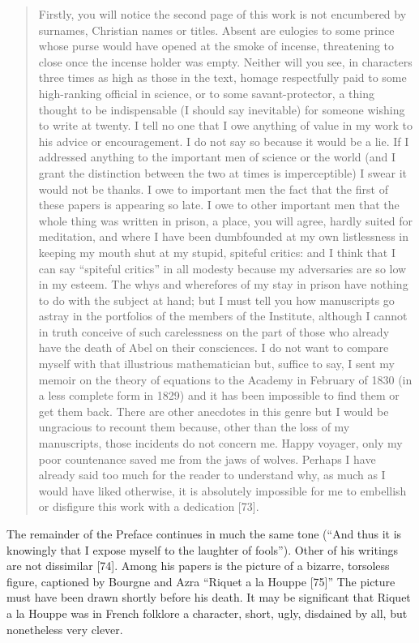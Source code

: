 \documentclass[12pt]{article}
\begin{document}
\begin{quote}
Firstly, you will notice the second page of this work is not encumbered by surnames, Christian names or titles. Absent are eulogies to some prince whose purse would have opened at the smoke of incense, threatening to close once the incense holder was empty. Neither will you see, in characters three times as high as those in the text, homage respectfully paid to some high-ranking official in science, or to some savant-protector, a thing thought to be indispensable (I should say inevitable) for someone wishing to write at twenty. I tell no one that I owe anything of value in my work to his advice or encouragement. I do not say so because it would be a lie. If I addressed anything to the important men of science or the world (and I grant the distinction between the two at times is imperceptible) I swear it would not be thanks. I owe to important men the fact that the first of these papers is appearing so late. I owe to other important men that the whole thing was written in prison, a place, you will agree, hardly suited for meditation, and where I have been dumbfounded at my own listlessness in keeping my mouth shut at my stupid, spiteful critics: and I think that I can say ``spiteful critics'' in all modesty because my adversaries are so low in my esteem. The whys and wherefores of my stay in prison have nothing to do with the subject at hand; but I must tell you how manuscripts go astray in the portfolios of the members of the Institute, although I cannot in truth conceive of such carelessness on the part of those who already have the death of Abel on their consciences. I do not want to compare myself with that illustrious mathematician but, suffice to say, I sent my memoir on the theory of equations to the Academy in February of 1830 (in a less complete form in 1829) and it has been impossible to find them or get them back. There are other anecdotes in this genre but I would be ungracious to recount them because, other than the loss of my manuscripts, those incidents do not concern me. Happy voyager, only my poor countenance saved me from the jaws of wolves. Perhaps I have already said too much for the reader to understand why, as much as I would have liked otherwise, it is absolutely impossible for me to embellish or disfigure this work with a dedication [73].
\end{quote}

The remainder of the Preface continues in much the same tone (``And thus it is knowingly that I expose myself to the laughter of fools''). Other of his writings are not dissimilar [74]. Among his papers is the picture of a bizarre, torsoless figure, captioned by Bourgne and Azra ``Riquet a la Houppe [75]'' The picture must have been drawn shortly before his death. It may be significant that Riquet a la Houppe was in French folklore a character, short, ugly, disdained by all, but nonetheless very clever.
\end{document}
